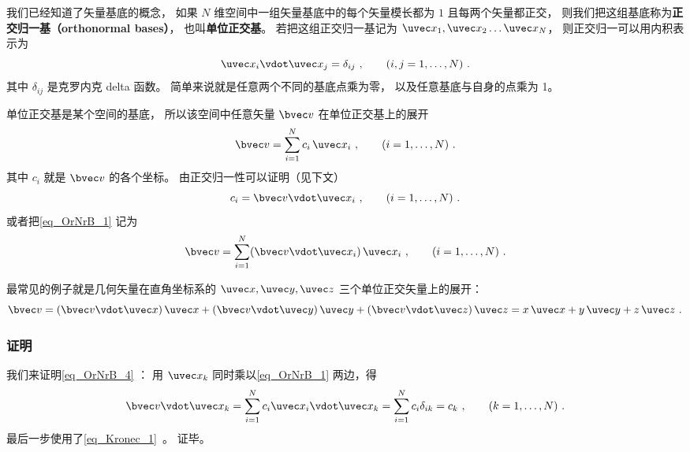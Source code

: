 
\begin{issues}
\issueDraft
\end{issues}


我们已经知道了矢量基底的概念， 如果 $N$ 维空间中一组矢量基底中的每个矢量模长都为 $1$ 且每两个矢量都正交， 则我们把这组基底称为\textbf{正交归一基（orthonormal bases）}， 也叫\textbf{单位正交基}。 若把这组正交归一基记为 $\uvec x_1,\uvec x_2\dots\uvec x_N$， 则正交归一可以用内积表示为
\begin{equation}\label{eq_OrNrB_3}
\uvec x_i \vdot \uvec x_j = \delta_{ij} ~,\qquad (i,j = 1,\dots, N)~.
\end{equation}
其中 $\delta_{ij}$ 是克罗内克 delta 函数。 简单来说就是任意两个不同的基底点乘为零， 以及任意基底与自身的点乘为 1。

单位正交基是某个空间的基底， 所以该空间中任意矢量 $\bvec v$ 在单位正交基上的展开
\begin{equation}\label{eq_OrNrB_1}
\bvec v = \sum_{i = 1}^N c_i \,\uvec x_i ~,\qquad (i = 1,\dots, N)~.
\end{equation}
其中 $c_i$ 就是 $\bvec v$ 的各个坐标。 由正交归一性可以证明（见下文）
\begin{equation}\label{eq_OrNrB_4}
c_i = \bvec v\vdot\uvec x_i ~,\qquad (i = 1,\dots, N)~.
\end{equation}
或者把\autoref{eq_OrNrB_1} 记为
\begin{equation}\label{eq_OrNrB_5}
\bvec v = \sum_{i = 1}^N (\bvec v\vdot\uvec x_i) \,\uvec x_i~, \qquad (i = 1,\dots, N)~.
\end{equation}

最常见的例子就是几何矢量在直角坐标系的 $\uvec x, \uvec y, \uvec z$ 三个单位正交矢量上的展开：
\begin{equation}
\bvec v = (\bvec v \vdot \uvec x)\,\uvec x + (\bvec v \vdot \uvec y)\,\uvec y + (\bvec v \vdot \uvec z)\,\uvec z = x \,\uvec x + y \,\uvec y + z \,\uvec z~.
\end{equation} 

\subsubsection{证明}
我们来证明\autoref{eq_OrNrB_4} ： 用 $\uvec x_k$ 同时乘以\autoref{eq_OrNrB_1} 两边，得
\begin{equation}\label{eq_OrNrB_2}
\bvec v \vdot \uvec x_k = \sum_{i = 1}^N  c_i \uvec x_i \vdot\uvec x_k = \sum_{i = 1}^N c_i \delta_{ik}  = c_k ~,\qquad (k = 1, \dots, N)~.
\end{equation}
最后一步使用了\autoref{eq_Kronec_1}~。 证毕。

